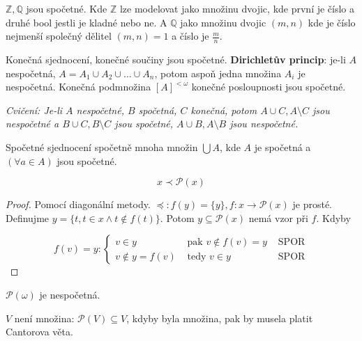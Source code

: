 \begin{dusl}
	$\mathbb{Z}, \mathbb{Q}$ jsou spočetné. Kde $\mathbb{Z}$ lze modelovat jako množinu dvojic, kde první je číslo a druhé bool jestli je kladné nebo ne. A $\mathbb{Q}$ jako množinu dvojic $(m,n)$ kde je číslo nejmenší společný dělitel $(m,n) = 1$ a číslo je $\frac{m}{n}$.	
\end{dusl}

\begin{dusl}
	Konečná sjednocení, konečné součiny jsou spočetné. \textbf{Dirichletův princip}: je-li $A$ nespočetná, $A = A_{1} \cup A_{2} \cup \dots \cup A_{n}$, potom aspoň jedna množina $A_{i}$ je nespočetná. Konečná podmnožina $[A]^{< \omega}$ konečné posloupnosti jsou spočetné.
\end{dusl}

\textit{Cvičení: Je-li $A$ nespočetné, $B$ spočetná, $C$ konečná, potom $A \cup C, A \setminus C$ jsou nespočetné a $B \cup C, B \setminus C$ jsou spočetné, $A \cup B, A \setminus B$ jsou nespočetné.}

\begin{pozn}
	Spočetné sjednocení spočetně mnoha množin $\bigcup A$, kde $A$ je spočetná a $(\forall a \in A)$ jsou spočetné.
\end{pozn}

\begin{thm}[Cantor]
	$$
	x \prec \mathcal{P}(x)
	$$
\end{thm}

\begin{proof}
	Pomocí diagonální metody. $\preceq : f(y) = \{y\}, f: x \to \mathcal{P}(x)$ je prosté. Definujme $y = \{t, t \in x \land t \notin f(t)\}$. Potom $y \subseteq \mathcal{P}(x)$ nemá vzor při $f$. Kdyby
	
	$$
	f(v) = y:
	\left\{
	\begin{array}{llr}
		v \in y & \text{ pak } v \notin f(v) = y & \text{ SPOR} \\
		v \notin y = f(v) & \text{ tedy } v \in y & \text{ SPOR}
	\end{array}
	\right.
	$$
\end{proof}

\begin{dusl}
	$\mathcal{P}(\omega)$ je nespočetná.
\end{dusl}

\begin{dusl}
	$V$ není množina: $\mathcal{P}(V) \subseteq V$, kdyby byla množina, pak by musela platit Cantorova věta.
\end{dusl}


